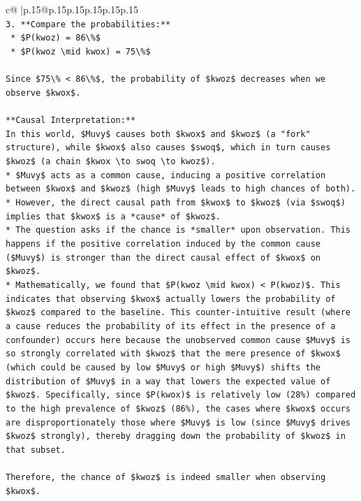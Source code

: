 \documentclass{article}
\begin{document}
{\begin{supertabular}{c@{$\;$}|p{.15\linewidth}@{}p{.15\linewidth}p{.15\linewidth}p{.15\linewidth}p{.15\linewidth}p{.15\linewidth}}
{{{\\ 
\texttt{3.  **Compare the probabilities:**} \\
\texttt{    *   \$P(kwoz) = 86\textbackslash{}\%\$} \\
\texttt{    *   \$P(kwoz \textbackslash{}mid kwox) = 75\textbackslash{}\%\$} \\
\\ 
\texttt{Since \$75\textbackslash{}\% < 86\textbackslash{}\%\$, the probability of \$kwoz\$ decreases when we observe \$kwox\$.} \\
\\ 
\texttt{**Causal Interpretation:**} \\
\texttt{In this world, \$Muvy\$ causes both \$kwox\$ and \$kwoz\$ (a "fork" structure), while \$kwox\$ also causes \$swoq\$, which in turn causes \$kwoz\$ (a chain \$kwox \textbackslash{}to swoq \textbackslash{}to kwoz\$).} \\
\texttt{*   \$Muvy\$ acts as a common cause, inducing a positive correlation between \$kwox\$ and \$kwoz\$ (high \$Muvy\$ leads to high chances of both).} \\
\texttt{*   However, the direct causal path from \$kwox\$ to \$kwoz\$ (via \$swoq\$) implies that \$kwox\$ is a *cause* of \$kwoz\$.} \\
\texttt{*   The question asks if the chance is *smaller* upon observation. This happens if the positive correlation induced by the common cause (\$Muvy\$) is stronger than the direct causal effect of \$kwox\$ on \$kwoz\$.} \\
\texttt{*   Mathematically, we found that \$P(kwoz \textbackslash{}mid kwox) < P(kwoz)\$. This indicates that observing \$kwox\$ actually lowers the probability of \$kwoz\$ compared to the baseline. This counter{-}intuitive result (where a cause reduces the probability of its effect in the presence of a confounder) occurs here because the unobserved common cause \$Muvy\$ is so strongly correlated with \$kwoz\$ that the mere presence of \$kwox\$ (which could be caused by low \$Muvy\$ or high \$Muvy\$) shifts the distribution of \$Muvy\$ in a way that lowers the expected value of \$kwoz\$. Specifically, since \$P(kwox)\$ is relatively low (28\%) compared to the high prevalence of \$kwoz\$ (86\%), the cases where \$kwox\$ occurs are disproportionately those where \$Muvy\$ is low (since \$Muvy\$ drives \$kwoz\$ strongly), thereby dragging down the probability of \$kwoz\$ in that subset.} \\
\\ 
\texttt{Therefore, the chance of \$kwoz\$ is indeed smaller when observing \$kwox\$.} \\
}}}
\end{supertabular}}
\end{document}
